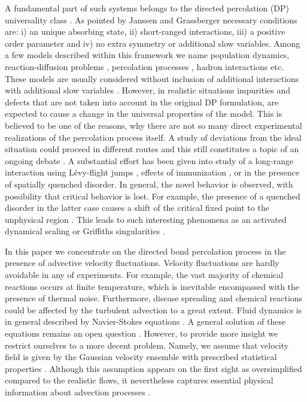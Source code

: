 \documentclass[aps,pre,url,twocolumn,superscriptaddress]{revtex4-1}
\begin{document}
A fundamental part of such systems belongs to the directed percolation (DP)  
 universality class \cite{Stauffer,HHL08}. As pointed by Janssen and Grassberger
 \cite{Janssen81,Grassberger82} necessary
conditions are: i) an unique absorbing state, ii) short-ranged interactions,
 iii) a positive order parameter and iv) no extra symmetry or additional slow variables.
 Among a few models described within this framework we name population dynamics,
 reaction-diffusion problems \cite{Odor04}, percolation processes \cite{JanTau04}, hadron
 interactions \cite{Cardy80} etc. 
These models are usually considered without inclusion of additional
interactions with additional slow variables \cite{Hohen77}.
However, in realistic situations impurities and defects that are not taken into account
 in the original DP formulation, are expected to cause a change in the
 universal properties of the model. 
 This is believed to be one of the reasons, why there are
not so many direct experimental realizations \cite{RRR03,TKCS07} of the percolation process itself.
 A study of deviations from the ideal situation could proceed in different routes and this 
 still constitutes a topic of an ongoing debate \cite{HHL08}.
A substantial effort has been given into study of a long-range interaction using
L{\'e}vy-flight jumps \cite{Jan99,Hin06,Hin07}, effects
 of immunization \cite{Hin01,JanTau04}, or in the presence of spatially quenched disorder.
 In general, the novel behavior is observed, with possibility that critical
 behavior is lost.
 For example, the presence of a quenched disorder in the latter case causes a shift
 of the critical fixed point to the unphysical region \cite{Janssen97}.
 This leads to such interesting phenomena as an activated
 dynamical scaling or Griffiths singularities \cite{MorDic96,CGM98,Vojta05,Vojta06}.

In this paper we concentrate on the directed bond percolation process in the presence
of advective velocity fluctuations. Velocity fluctuations are hardly avoidable
in any of experiments. For example, the vast majority of chemical reactions occurs
at finite temperature, which is inevitable encompassed with the presence of thermal noise. 
Furthermore, disease spreading and chemical reactions could be affected by the turbulent
advection to a great extent.
Fluid dynamics is in general described by Navier-Stokes equations \cite{Landau_fluid}.
A general solution of these equations remains an open question
 \cite{Frisch,Monin}. However, to provide more insight we restrict ourselves
 to a more decent problem.
Namely, we assume that velocity field is given by the Gaussian 
velocity ensemble with prescribed  statistical properties \cite{Kra68,Ant99}.
 Although this assumption appears on the first sight as
 oversimplified compared to the realistic flows, it nevertheless captures essential
 physical information about advection processes \cite{Kra68,FGV01,turbo}.
\end{document}
